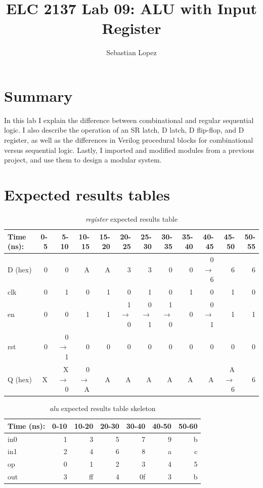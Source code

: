 \documentclass[11pt]{article}
\begin{document}
\title{ELC 2137 Lab 09: ALU with Input Register }
\author{Sebastian Lopez}
\maketitle

\section*{Summary}

In this lab I explain the difference between combinational and regular sequential logic. I also describe the operation of an SR latch, D latch, D flip-flop, and D register, as well as the differences in Verilog procedural blocks for combinational versus sequential logic. Lastly, I imported and modified modules from a previous project, and use them to design a modular system.

\section*{Expected results tables}

\begin{table}[ht]\centering
	\caption{\textit{register} expected results table}
	\label{ALU:tbl:register_ERT}\medskip
	\begin{tabular}{l|rrrrrrrrrrr}
		Time (ns): & 0-5 & 5-10 & 10-15 & 15-20 & 20-25 & 25-30 & 30-35 & 35-40 & 40-45 & 45-50 & 50-55 \\
		\midrule
		D (hex) & 0 & 0 	  & A & A & 3 	    & 3 	  & 0 	    & 0 & 0$\to$6 & 6 & 6 \\
		clk     & 0 & 1 	  & 0 & 1 & 0 	    & 1 	  & 0 	    & 1 & 0 	  & 1 & 0 \\
		en  	& 0 & 0 	  & 1 & 1 & 1$\to$0 & 0$\to$1 & 1$\to$0 & 0 & 0$\to$1 & 1 & 1 \\
		rst 	& 0 & 0$\to$1 & 0 & 0 & 0 		& 0 	  & 0		& 0 & 0		  & 0 & 0 \\
		\midrule
		Q (hex) & X & X$\to$0 & 0$\to$A & A & A & A & A & A & A & A$\to$6 & 6 \\
		\bottomrule
	\end{tabular}
\end{table}

\begin{table}[ht]\centering
	\caption{\textit{alu} expected results table skeleton}
	\label{ALU:tbl:alu_ERT}\medskip
	\begin{tabular}{l|rrrrrr}
		Time (ns): & 0-10 & 10-20 & 20-30 & 30-40 & 40-50 & 50-60 \\
		\midrule
		in0 & 1  & 3 & 5 & 7 & 9 & b \\
		in1 & 2  & 4 & 6 & 8 & a & c \\
		op & 0  & 1 & 2 & 3 & 4 & 5 \\
		\midrule
		out & 3  & ff & 4 & 0f & 3 & b \\
		\bottomrule
	\end{tabular}
\end{table}
\end{document}
